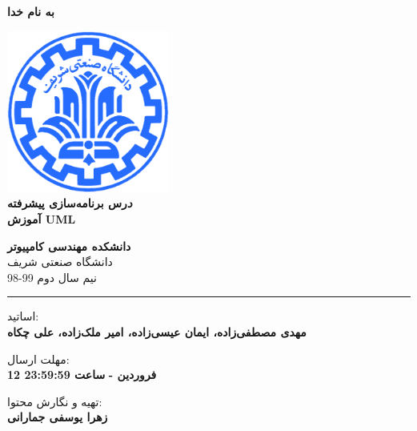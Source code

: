 \documentclass[]{article}
\begin{document}
\begin{titlepage}
\begin{center}

\textbf{ \Huge{به نام خدا} }
        
\vspace{0.2cm}

\includegraphics[width=0.4\textwidth]{sharif1.png}\\
\vspace{0.2cm}
\textbf{ \Huge{\emph درس برنامه‌سازی پیشرفته} }\\
\vspace{0.25cm}
\textbf{ \Large{آموزش UML} }
\vspace{0.2cm}
       
 
      \large \textbf{دانشکده مهندسی کامپیوتر}\\\vspace{0.1cm}
    \large   دانشگاه صنعتی شریف\\\vspace{0.2cm}
       \large   ﻧﯿﻢ سال دوم 99-98 \\\vspace{0.10cm}
      \noindent\rule[1ex]{\linewidth}{1pt}
اساتید:\\
    \textbf{{مهدی مصطفی‌زاده، ایمان عیسی‌زاده، امیر ملک‌زاده، علی چکاه}}



    \vspace{0.20cm}

   مهلت ارسال:\\
    \textbf{{12 فروردین - }}
    \textbf{{ساعت 23:59:59}}


        \vspace{0.10cm}
تهیه و نگارش محتوا:\\
    \textbf{{زهرا یوسفی جمارانی}}
    

    
        \vspace{0.05cm}

\end{center}
\end{titlepage}
\end{document}

